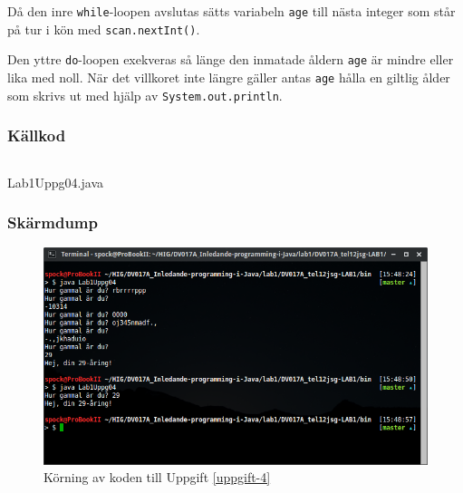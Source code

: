 Då den inre \texttt{while}-loopen avslutas sätts variabeln \texttt{age} till 
nästa integer som står på tur i kön med \texttt{scan.nextInt()}.
\par Den yttre \texttt{do}-loopen exekveras så länge den inmatade åldern \texttt{age}
är mindre eller lika med noll. När det villkoret inte längre gäller antas \texttt{age}
hålla en giltlig ålder som skrivs ut med hjälp av \texttt{System.out.println}.

\subsubsection{Källkod}\label{uppgift-4_src}
    \inputminted[linenos]{java}{src/Lab1Uppg04.java}
    \caption{Lab1Uppg04.java}
    \label{Uppg4src}

\subsubsection{Skärmdump}
\begin{figure}[htbp]
    \centering
        \includegraphics[width=\linewidth]{img/04.png}
    \caption{Körning av koden till Uppgift \ref{uppgift-4}}
    \label{fig:screenshot-04}
\end{figure}
